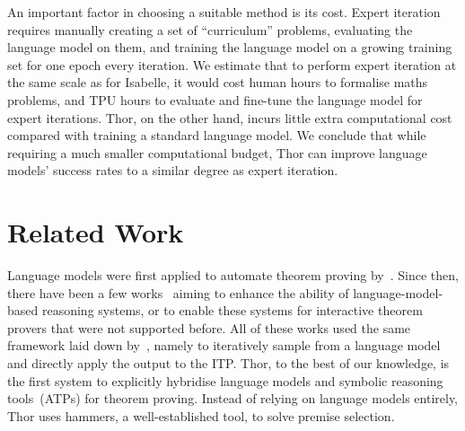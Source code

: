\documentclass{article}
\begin{document}
An important factor in choosing a suitable method is its cost.
Expert iteration requires manually creating a set of ``curriculum'' problems, evaluating the language model on them, and training the language model on a growing training set for one epoch every iteration.
We estimate that to perform expert iteration at the same scale as \citet{polu2022formal} for Isabelle, it would cost  human hours to formalise  maths problems, and  TPU hours to evaluate and fine-tune the language model for  expert iterations.
Thor, on the other hand, incurs little extra computational cost compared with training a standard language model.
We conclude that while requiring a much smaller computational budget, Thor can improve language models' success rates to a similar degree as expert iteration.




 \section{Related Work}
\label{sec: related}






Language models were first applied to automate theorem proving by~\citet{polu2020generative}. 
Since then, there have been a few works~\citep{han2021proof, jiang2021lisa, polu2022formal} aiming to enhance the ability of language-model-based reasoning systems, or to enable these systems for interactive theorem provers that were not supported before. All of these works used the same framework laid down by~\citet{polu2020generative}, namely to iteratively sample from a language model and directly apply the output to the ITP. Thor, to the best of our knowledge, is the first system to explicitly hybridise language models and symbolic reasoning tools~(ATPs) for theorem proving.
Instead of relying on language models entirely, Thor uses hammers, a well-established tool, to solve premise selection.
\end{document}
